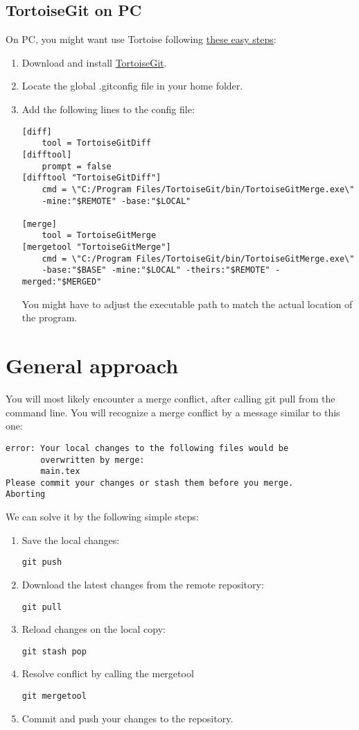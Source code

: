 \documentclass{report}
\begin{document}
\subsection{TortoiseGit on PC}
On PC, you might want use Tortoise following \href{https://gist.github.com/ellisda/25cdd92129c5b44406ab}{these easy steps}:
\begin{enumerate}[noitemsep]
    \item Download and install \href{https://tortoisegit.org/download}{TortoiseGit}.
    \item Locate the global .gitconfig file in your home folder.
    \item Add the following lines to the config file:
    \begin{verbatim}
[diff]
    tool = TortoiseGitDiff	
[difftool]
    prompt = false
[difftool "TortoiseGitDiff"]
    cmd = \"C:/Program Files/TortoiseGit/bin/TortoiseGitMerge.exe\"
    -mine:"$REMOTE" -base:"$LOCAL" 

[merge]
    tool = TortoiseGitMerge	
[mergetool "TortoiseGitMerge"]
    cmd = \"C:/Program Files/TortoiseGit/bin/TortoiseGitMerge.exe\"
    -base:"$BASE" -mine:"$LOCAL" -theirs:"$REMOTE" -merged:"$MERGED"
    \end{verbatim}
    You might have to adjust the executable path to match the actual location of the program.
\end{enumerate}

\section{General approach}
You will most likely encounter a merge conflict, after calling git pull from the command line. You will recognize a merge conflict by a message similar to this one:
\begin{verbatim}
error: Your local changes to the following files would be 
       overwritten by merge:
       main.tex
Please commit your changes or stash them before you merge. 
Aborting
\end{verbatim}
We can solve it by the following simple steps:
\begin{enumerate}[noitemsep]
    \item Save the local changes:
    \begin{verbatim}
git push
    \end{verbatim}
    \item  Download the latest changes from the remote repository:
    \begin{verbatim}
git pull
    \end{verbatim}
    \item Reload changes on the local copy:
    \begin{verbatim}
git stash pop
    \end{verbatim}
    \item Resolve conflict by calling the mergetool
    \begin{verbatim}
git mergetool
    \end{verbatim}
    \item Commit and push your changes to the repository.
\end{enumerate}
\end{document}
